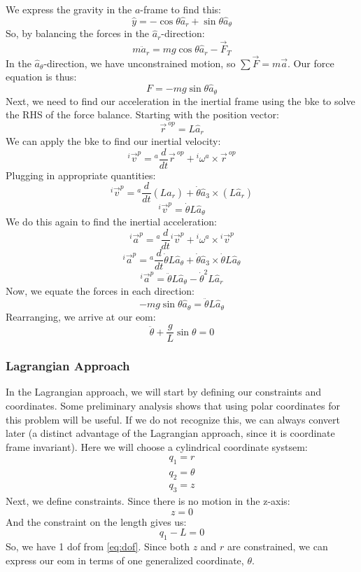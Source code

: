 \documentclass[12pt]{report}
\begin{document}
We express the gravity in the $a$-frame to find this:
$$\hat{y}=-\cos\theta\hat{a}_r+\sin\theta \hat{a}_\theta$$
So, by balancing the forces in the $\hat{a}_r$-direction:
$$m{\ddot{a}}_r=mg\cos\theta \hat{a}_r-\vec{F}_T$$
In the $\hat{a}_\theta$-direction, we have unconstrained motion, so $\sum\vec{F}=m\vec{a}$. Our force equation is thus: 
$$F=-mg\sin\theta\hat{a}_{\theta}$$
Next, we need to find our acceleration in the inertial frame using the \gls{bke} to solve the RHS of the force balance. Starting with the position vector:
$$\vec{r}^{\ op}=L\hat{a}_r$$
We can apply the \gls{bke} to find our inertial velocity:
$${}^i\vec{v}^p={}^a\frac{d}{dt}\vec{r}^{\ op}+{}^i\omega^a\times\vec{r}^{\ op}$$
Plugging in appropriate quantities:
$${}^i\vec{v}^p={}^a\frac{d}{dt}(L\hat{a}_r)+\dot{\theta}\hat{a}_3\times(L\hat{a}_r)$$
$${}^i\vec{v}^p=\dot{\theta}L\hat{a}_\theta$$
We do this again to find the inertial acceleration:
$${}^i\vec{a}^p={}^a\frac{d}{dt}{}^i\vec{v}^p+{}^i\omega^a\times{}^i\vec{v}^p$$
$${}^i\vec{a}^p={}^a\frac{d}{dt}{}\dot{\theta}L\hat{a}_\theta+\dot{\theta}\hat{a}_3\times\dot{\theta}L\hat{a}_\theta$$
$${}^i\vec{a}^p=\ddot{\theta}L\hat{a}_\theta-\dot{\theta}^2L\hat{a}_r$$
Now, we equate the forces in each direction:
$$-mg\sin\theta\hat{a}_\theta=\ddot{\theta}L\hat{a}_\theta$$
Rearranging, we arrive at our \gls{eom}:
$$\ddot{\theta}+\frac{g}{L}\sin\theta=0$$
\subsubsection{Lagrangian Approach}
In the \gls{Lagrangian} approach, we will start by defining our constraints and coordinates. Some preliminary analysis shows that using polar coordinates for this problem will be useful. If we do not recognize this, we can always convert later (a distinct advantage of the \gls{Lagrangian} approach, since it is coordinate frame invariant). Here we will choose a cylindrical coordinate systsem:
\begin{gather}
    q_1=r\\q_2=\theta\\q_3=z
\end{gather}
Next, we define constraints. Since there is no motion in the z-axis:
$$z=0$$
And the constraint on the length gives us:
$$q_1-L=0$$
So, we have 1 \gls{dof} from \eqref{eq:dof}. Since both $z$ and $r$ are constrained, we can express our \gls{eom} in terms of one generalized coordinate, $\theta$.
\end{document}
